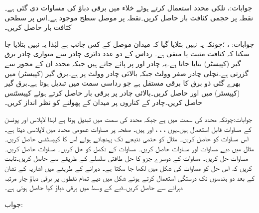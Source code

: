 جوابات:،  
نلکی محدد استعمال کرتے ہوئے خلاء میں برقی دباؤ کی مساوات  دی گئی ہے۔ نقطہ  پر حجمی کثافت بار  حاصل کریں۔نقطہ  پر موصل سطح موجود ہے۔اس پر سطحی کثافت بار  حاصل کریں۔

جوابات: ، ؛چونکہ یہ نہیں بتلایا گیا کہ میدان موصل کے کس جانب ہے لہٰذا یہ نہیں بتلایا جا سکتا کہ کثافت مثبت یا منفی ہے۔
رداس  کے دو عدد دائری چادر سے متوازی چادر برق گیر (کپیسٹر)  بنایا جاتا ہے۔یہ چادر  اور  پر پائے جاتے ہیں جبکہ  محدد ان کے محور سے گزرتی ہے۔نچلی چادر صفر وولٹ جبکہ بالائی چادر  وولٹ پر ہے۔برق گیر (کپیسٹر)  میں بھرے گئی ذو برق کا برقی مستقل  ہے جو رداسی سمت میں تبدیل ہوتا ہے۔برق گیر (کپیسٹر)  میں  اور  حاصل کریں۔بالائی چادر پر برقی بار حاصل کرتے ہوئے کپیسٹنس حاصل کریں۔چادر کے کناروں پر میدان کے پھولنے کو نظر انداز کریں۔

جوابات:چونکہ   محدد  کی سمت میں ہے جبکہ  محدد  کی سمت میں تبدیل ہوتا ہے لہٰذا لاپلاس اور پوئسن کے مساوات قابل استعمال ہیں۔یوں ،  ، ،  اور  ہیں۔
صفحہ  پر مساوات  عمومی محدد میں لاپلاسی دیتا ہے۔اس مساوات کو حاصل کریں۔
مثال  کو حتمی نتیجے تک پہنچاتے ہوئے اس  کا کپیسٹنس حاصل کریں۔
مثال  میں دیے مساوات  اور مساوات  حاصل کریں۔
مساوات  کے تکمل کو حل کریں۔
مساوات  حاصل کریں۔
مساوات  حل کریں۔
مساوات  کے دوسرے جزو کا حل طاقتی سلسلے کے طریقے سے حاصل کریں۔ثابت کریں کہ اس حل کو مساوات  کی شکل میں لکھا جا سکتا ہے۔
دہرانے کے طریقے میں اشاریہ کے نشان کے بعد دو ہندسوں تک درستگی استعمال کرتے ہوئے شکل  میں دیے تمام نقطوں پر برقی دباؤ چار مرتبہ دہرانے سے حاصل کریں۔ڈبے کے وسط میں برقی دباؤ کیا حاصل ہوتی ہے۔

جواب: 
